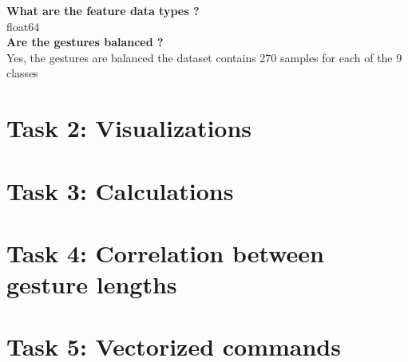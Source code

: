 \documentclass[14pt,a4paper]{extarticle}
\begin{document}
    \noindent \textbf{What are the feature data types ? }\\
    float64 \\

    \noindent \textbf{Are the gestures balanced ?} \\
    Yes, the gestures are balanced the dataset contains 270 samples for each of the 9 classes

    \section*{Task 2: Visualizations}
    \section*{Task 3: Calculations}
    \section*{Task 4: Correlation between gesture lengths}
    \section*{Task 5: Vectorized commands}
\end{document}
